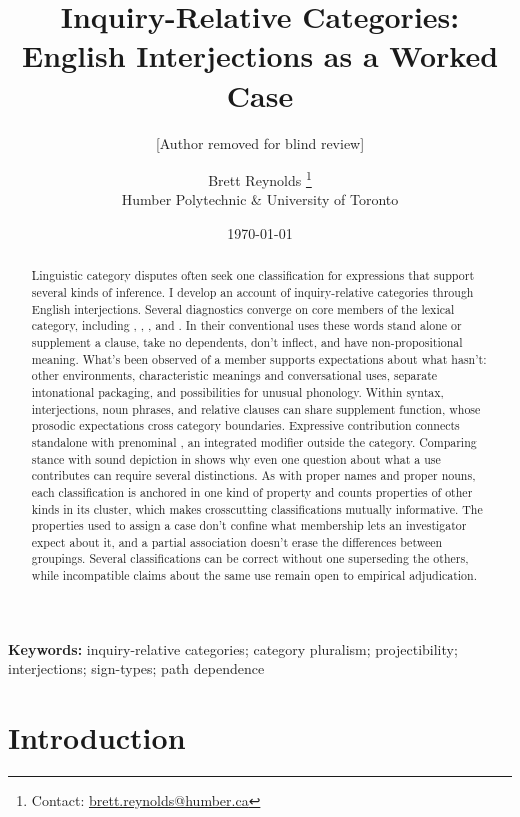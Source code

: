 \documentclass[12pt]{article}
\title{Inquiry-Relative Categories:\\English Interjections as a Worked Case}
\author{[Author removed for blind review]}
\author{Brett Reynolds \orcidlink{0000-0003-0073-7195}%
\thanks{Contact: \href{mailto:brett.reynolds@humber.ca}{brett.reynolds@humber.ca}}\\
Humber Polytechnic \& University of Toronto}
\date{\today}
\begin{document}
\maketitle

\begin{abstract}
Linguistic category disputes often seek one classification for expressions
that support several kinds of inference. I develop an account of
inquiry-relative categories through English interjections. Several
diagnostics converge on core members of the lexical category, including
, , , and . In
their conventional uses these words stand alone or supplement a clause,
take no dependents, don't inflect, and have non-propositional meaning. What's been observed of a member supports
expectations about what hasn't: other environments, characteristic meanings and conversational uses,
separate intonational packaging, and possibilities for unusual phonology.
Within syntax, interjections, noun phrases, and relative clauses can share
supplement function, whose prosodic expectations cross category
boundaries. Expressive contribution connects standalone 
with prenominal , an integrated modifier outside the category. Comparing
stance with sound depiction in  shows why even one question
about what a use contributes can require several distinctions.
As with proper names and proper nouns, each classification is anchored
in one kind of property and counts properties of other kinds in its
cluster, which makes crosscutting classifications mutually informative. The properties used to assign a case don't confine what
membership lets an investigator expect about it, and a partial association doesn't
erase the differences between groupings. Several classifications can
be correct without one superseding the others, while incompatible
claims about the same use remain open to empirical adjudication.
\end{abstract}

\noindent\textbf{Keywords:} inquiry-relative categories; category pluralism;
projectibility; interjections; sign-types; path dependence


\section{Introduction}\label{sec:intro}
\end{document}
